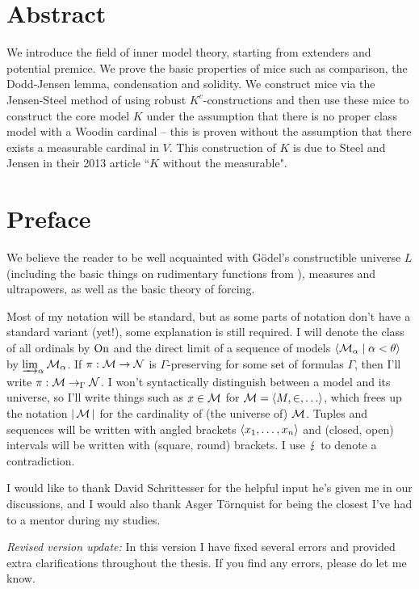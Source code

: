\thispagestyle{fancy}
\setlength{\parindent}{18pt}

\begin{onehalfspacing}

\vspace*{40pt}

\section*{\huge Abstract}
We introduce the field of inner model theory, starting from extenders and potential premice. We prove the basic properties of mice such as comparison, the Dodd-Jensen lemma, condensation and solidity. We construct mice via the Jensen-Steel method of using robust $K^c$-constructions and then use these mice to construct the core model $K$ under the assumption that there is no proper class model with a Woodin cardinal -- this is proven without the assumption that there exists a measurable cardinal in $V$. This construction of $K$ is due to Steel and Jensen in their 2013 article ``$K$ without the measurable".

\vspace*{40pt}

\section*{\huge Preface}
We believe the reader to be well acquainted with Gödel's constructible universe $L$ (including the basic things on rudimentary functions from \cite{Jensen}), measures and ultrapowers, as well as the basic theory of forcing.

\quad Most of my notation will be standard, but as some parts of notation don't have a standard variant (yet!), some explanation is still required. I will denote the class of all ordinals by $\operatorname{On}$ and the direct limit of a sequence of models $\langle \operatorname{\mathcal{M}}_\alpha\mid\alpha<\theta\rangle$ by $\varinjlim_\alpha\operatorname{\mathcal{M}}_\alpha$. If $\pi:\operatorname{\mathcal{M}}\to\operatorname{\mathcal{N}}$ is $\Gamma$-preserving for some set of formulas $\Gamma$, then I'll write $\pi:\operatorname{\mathcal{M}}\to_\Gamma\operatorname{\mathcal{N}}$. I won't syntactically distinguish between a model and its universe, so I'll write things such as $x\in\operatorname{\mathcal{M}}$ for $\operatorname{\mathcal{M}}=\langle M,\in,\hdots\rangle$, which frees up the notation $|\operatorname{\mathcal{M}}|$ for the cardinality of (the universe of) $\operatorname{\mathcal{M}}$. Tuples and sequences will be written with angled brackets $\langle x_1,\hdots,x_n\rangle$ and (closed, open) intervals will be written with (square, round) brackets. I use $\operatorname{\lightning}$ to denote a contradiction.

\quad I would like to thank David Schrittesser for the helpful input he's given me in our discussions, and I would also thank Asger Törnquist for being the closest I've had to a mentor during my studies.

\quad \textit{Revised version update:} In this version I have fixed several errors and provided extra clarifications throughout the thesis. If you find any errors, please do let me know.

\end{onehalfspacing}
